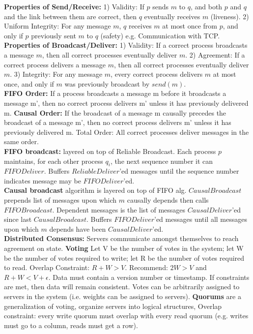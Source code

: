 \documentclass[9pt,landscape]{article}
\begin{document}
\begin{multicols}{3}
{\bf Properties of Send/Receive:}
1) Validity: If $p$ sends $m$ to $q$, and both $p$ and $q$ and the link between them are correct, then $q$ eventually receives $m$ (liveness). 2) Uniform Integrity: For any message $m$, $q$ receives $m$ at most once from $p$, and only if $p$ previously sent $m$ to $q$ (safety) e.g. Communication with TCP.
{\bf Properties of Broadcast/Deliver:}
1) Validity: If a correct process broadcasts a message $m$, then all correct processes eventually deliver $m$. 2) Agreement: If a correct process delivers a message $m$, then all correct processes eventually deliver $m$. 3) Integrity: For any message $m$, every correct process delivers $m$ at most once, and only if $m$ was previously broadcast by $send(m)$.\\
{\bf FIFO Order:} If a process broadcasts a message m before it broadcasts a message m', then no correct process delivers m' unless it has previously delivered m. 
{\bf Causal Order:} If the broadcast of a message m causally precedes the broadcast of a message m', then no correct process delivers m' unless it has previously delivered m. 
Total Order: All correct processes deliver messages in the same order.\\
{\bf FIFO broadcast:} layered on top of Reliable Broadcast. Each process $p$ maintains, for each other process $q_i$, the next sequence number it can $FIFODeliver$. Buffers $ReliableDeliver$'ed messages until the sequence number indicates message may be $FIFODeliver$'ed.\\
{\bf Causal broadcast} algorithm is layered on top of FIFO alg. $CausalBroadcast$ prepends list of messages upon which $m$ causally depends then calls $FIFOBroadcast$. Dependent messages is the list of messages $CausalDeliver$'ed since last $CausalBroadcast$. Buffers $FIFODeliver$'ed messages until all messages upon which $m$ depends have been $CausalDeliver$'ed.\\ 
{\bf Distributed Consensus:} Servers communicate amongst themselves to reach agreement on state.
{\bf Voting} Let V be the number of votes in the system; let W be the number of votes required to write; let R be the number of votes required to read. Overlap Constraint: $R + W > V$. Recommend: $2W > V$ and $R + W < V + \epsilon$. Data must contain a version number or timestamp. If constraints are met, then data will remain consistent. Votes can be arbitrarily assigned to servers in
the system (i.e. weights can be assigned to servers).
{\bf Quorums} are a generalization of voting, organize servers into logical structures, Overlap constraint: every write quorum must overlap with every read quorum (e.g. writes must go to a column, reads must get a row).


\end{multicols}
\end{document}
